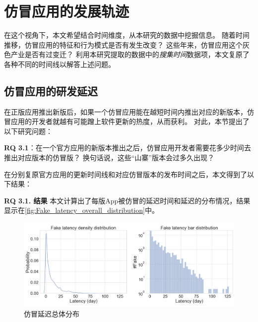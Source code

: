 \section{仿冒应用的发展轨迹}
在这个视角下，本文希望结合时间维度，从本研究的数据中挖掘信息。
随着时间推移，仿冒应用的特征和行为模式是否有发生改变？
这些年来，仿冒应用这个灰色产业是否有过变迁？
利用本研究提取的数据中的\emph{搜集时间}数据项，本文复原了各种不同的时间线以解答上述问题。

\subsection{仿冒应用的研发延迟}
在正版应用推出新版后，如果一个仿冒应用能在越短时间内推出对应的新版本，仿冒应用的开发者就越有可能蹭上软件更新的热度，从而获利。
对此，本节提出了以下研究问题：

{\bf RQ 3.1}：在一个官方应用的新版本推出之后，仿冒应用开发者需要花多少时间去推出对应版本的仿冒版？
换句话说，这些``山寨''版本会过多久出现？

在分别复原官方应用的更新时间线和对应仿冒版本的发布时间之后，本文得到了以下结果：

{\bf RQ 3.1. 结果}
本文计算出了每版App被仿冒的延迟时间和延迟的分布情况，结果显示在\autoref{fig:Fake_latency_overall_distribution}中。

\begin{figure}
	\centering
	\includegraphics[width=\textwidth]{./Figures/edwin-Fake_latency_overall_distribution2.png}
	\caption{仿冒延迟总体分布}
	\label{fig:Fake_latency_overall_distribution}
\end{figure}

